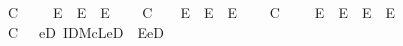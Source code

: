 \begin{isabellebody}
\ \ \ C\ {\isacharcolon}\ {\isachardoublequoteopen}\isactrlbold {\isasymforall}{\isasymgamma}\ {\isasymbeta}\ {\isasymalpha}{\isachardot}\ {\isacharparenleft}E{\isacharparenleft}{\isasymgamma}{\isasymcdot}{\isasymbeta}{\isacharparenright}\ \isactrlbold {\isasymand}\ E{\isacharparenleft}{\isacharparenleft}{\isasymgamma}{\isasymcdot}{\isasymbeta}{\isacharparenright}{\isasymcdot}{\isasymalpha}{\isacharparenright}{\isacharparenright}\ \isactrlbold {\isasymrightarrow}\ E{\isacharparenleft}{\isasymbeta}{\isasymcdot}{\isasymalpha}{\isacharparenright}{\isachardoublequoteclose}\ \isanewline
\ \ \ C\ {\isachardoublequoteopen}\isactrlbold {\isasymforall}{\isasymgamma}\ {\isasymbeta}\ {\isasymalpha}{\isachardot}\ {\isacharparenleft}E{\isacharparenleft}{\isasymbeta}{\isasymcdot}{\isasymalpha}{\isacharparenright}\ \isactrlbold {\isasymand}\ E{\isacharparenleft}{\isasymgamma}{\isasymcdot}{\isacharparenleft}{\isasymbeta}{\isasymcdot}{\isasymalpha}{\isacharparenright}{\isacharparenright}{\isacharparenright}\ \isactrlbold {\isasymrightarrow}\ E{\isacharparenleft}{\isasymgamma}{\isasymcdot}{\isasymbeta}{\isacharparenright}{\isachardoublequoteclose}\ \isanewline
\ \ \ C\ {\isacharcolon}\ {\isachardoublequoteopen}\isactrlbold {\isasymforall}{\isasymgamma}\ {\isasymbeta}\ {\isasymalpha}{\isachardot}\ {\isacharparenleft}E{\isacharparenleft}{\isasymgamma}{\isasymcdot}{\isasymbeta}{\isacharparenright}\ \isactrlbold {\isasymand}\ E{\isacharparenleft}{\isasymbeta}{\isasymcdot}{\isasymalpha}{\isacharparenright}{\isacharparenright}\ \isactrlbold {\isasymrightarrow}\ {\isacharparenleft}E{\isacharparenleft}{\isacharparenleft}{\isasymgamma}{\isasymcdot}{\isasymbeta}{\isacharparenright}{\isasymcdot}{\isasymalpha}{\isacharparenright}\ \isactrlbold {\isasymand}\ E{\isacharparenleft}{\isasymgamma}{\isasymcdot}{\isacharparenleft}{\isasymbeta}{\isasymcdot}{\isasymalpha}{\isacharparenright}{\isacharparenright}\ \isactrlbold {\isasymand}\ {\isacharparenleft}{\isacharparenleft}{\isasymgamma}{\isasymcdot}{\isasymbeta}{\isacharparenright}{\isasymcdot}{\isasymalpha}{\isacharparenright}\ {\isacharequal}\ {\isacharparenleft}{\isasymgamma}{\isasymcdot}{\isacharparenleft}{\isasymbeta}{\isasymcdot}{\isasymalpha}{\isacharparenright}{\isacharparenright}{\isacharparenright}{\isachardoublequoteclose}\ \ \isanewline
\ \ \ C\ {\isacharcolon}\ {\isachardoublequoteopen}\isactrlbold {\isasymforall}{\isasymgamma}{\isachardot}\ \isactrlbold {\isasymexists}eD{\isachardot}\ IDMcL{\isacharparenleft}eD{\isacharparenright}\ \isactrlbold {\isasymand}\ E{\isacharparenleft}{\isasymgamma}{\isasymcdot}eD{\isacharparenright}{\isachardoublequoteclose}\ \isanewline

\end{isabellebody}
